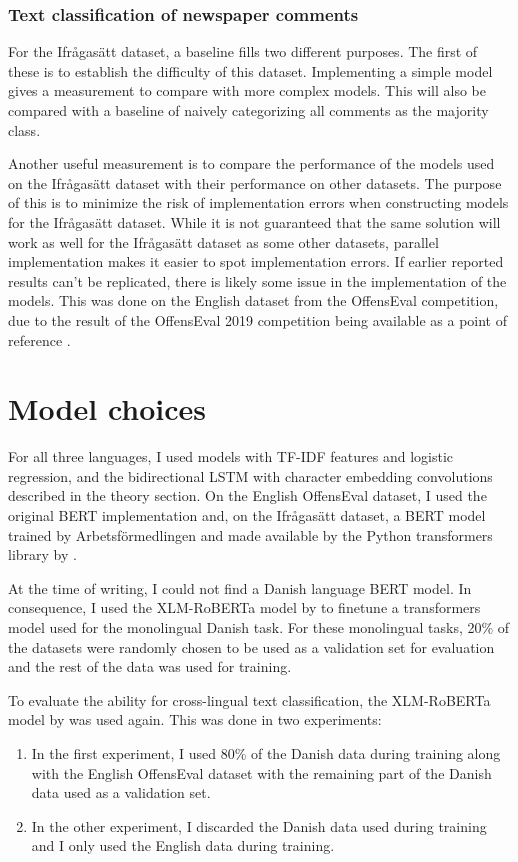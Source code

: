\documentclass[nofilelist]{cslthse-msc}
\begin{document}
\subsubsection{Text classification of newspaper comments}
For the Ifrågasätt dataset, a baseline fills two different purposes. The first of these is to establish the difficulty of this dataset. Implementing a simple model gives a measurement to compare with more complex models. This will also be compared with a baseline of naively categorizing all comments as the majority class.

Another useful measurement is to compare the performance of the models used on the Ifrågasätt dataset with their performance on other datasets. The purpose of this is to minimize the risk of implementation errors when constructing models for the Ifrågasätt dataset. While it is not guaranteed that the same solution will work as well for the Ifrågasätt dataset as some other datasets, parallel implementation makes it easier to spot implementation errors. If earlier reported results can't be replicated, there is likely some issue in the implementation of the models. This was done on the English dataset from the OffensEval competition, due to the result of the OffensEval 2019 competition being available as a point of reference \citep{zampieri2019semeval}.

\section{Model choices}

For all three languages, I used  models with TF-IDF features and logistic regression, and the bidirectional LSTM with character embedding convolutions described in the theory section. On the English OffensEval dataset, I used the original BERT implementation and, on the Ifrågasätt dataset, a BERT model trained by Arbetsförmedlingen and made available by the Python transformers library  by \citet{Wolf2019HuggingFacesTS}. 

At the time of writing, I could not find a Danish language BERT model. In consequence, I used the XLM-RoBERTa model by \citet{conneau2019unsupervised} to finetune a transformers model used for the monolingual Danish task. For these monolingual tasks, 20\% of the datasets were randomly chosen to be used as a validation set for evaluation and the rest of the data was used for training.

To evaluate the ability for cross-lingual text classification, the XLM-RoBERTa model by \citet{conneau2019unsupervised} was used again. This was done in two experiments:
\begin{enumerate}
    \item In the first experiment, I used  80\% of the Danish data  during training along with the English OffensEval dataset with the remaining part of the Danish data used as a validation set.
    \item  In the other experiment, I discarded the Danish data used during training and I only used the English data during training.
\end{enumerate}
 
\end{document}
